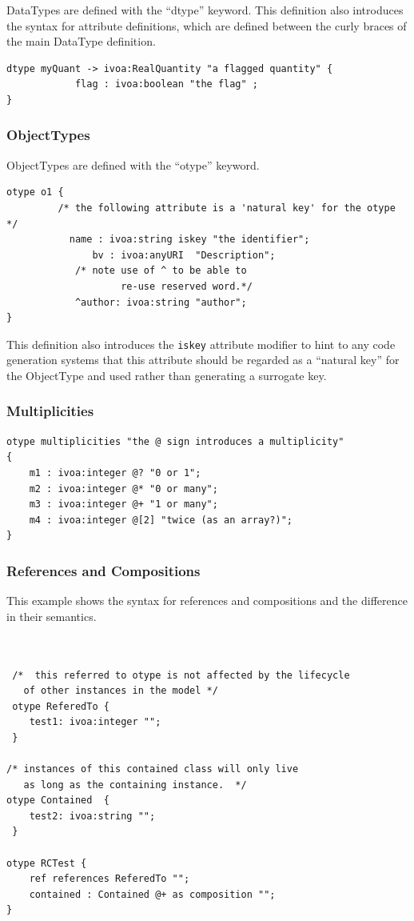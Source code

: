 \documentclass[11pt,a4paper]{ivoa}
\begin{document}
DataTypes are defined with the ``dtype'' keyword. This definition also introduces the syntax for attribute definitions, which are defined between the curly
braces of the main DataType definition.
\begin{lstlisting}[language=vodsl]
dtype myQuant -> ivoa:RealQuantity "a flagged quantity" {
			flag : ivoa:boolean "the flag" ;
}

\end{lstlisting}



\subsubsection{ObjectTypes}
ObjectTypes are defined with the ``otype'' keyword.
\begin{lstlisting}[language=vodsl]
otype o1 {
	     /* the following attribute is a 'natural key' for the otype */
	       name : ivoa:string iskey "the identifier";
			   bv : ivoa:anyURI  "Description";
		    /* note use of ^ to be able to 
		            re-use reserved word.*/	
		    ^author: ivoa:string "author"; 
}

\end{lstlisting}

This definition also introduces the \lstinline{iskey} attribute modifier to hint to any code generation systems that this attribute should be regarded as a
``natural key'' for the ObjectType and used rather than generating a surrogate key.

\subsubsection{Multiplicities}
\begin{lstlisting}[language=vodsl]
otype multiplicities "the @ sign introduces a multiplicity"
{
	m1 : ivoa:integer @? "0 or 1";
	m2 : ivoa:integer @* "0 or many";
	m3 : ivoa:integer @+ "1 or many";
	m4 : ivoa:integer @[2] "twice (as an array?)";
}

\end{lstlisting}

\subsubsection{References and Compositions}

This example shows the syntax for references and compositions and the difference in their semantics.
\begin{lstlisting}[language=vodsl]


 /*  this referred to otype is not affected by the lifecycle
   of other instances in the model */
 otype ReferedTo { 
 	test1: ivoa:integer "";
 }

/* instances of this contained class will only live
   as long as the containing instance.  */
otype Contained  {
 	test2: ivoa:string "";
 }
 
otype RCTest { 
	ref references ReferedTo "";
	contained : Contained @+ as composition "";
}

\end{lstlisting}
\end{document}
